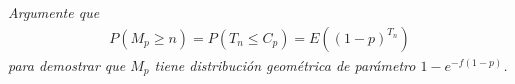 \emph{
	Argumente que
	\begin{align}
		P(M_p\geq n)=P(T_n\leq C_p)=E((1-p)^{T_n})
	\end{align}
	para demostrar que $M_p$ tiene distribuci\'on geom\'etrica de par\'ametro $1-e^{-f(1-p)}$.
}